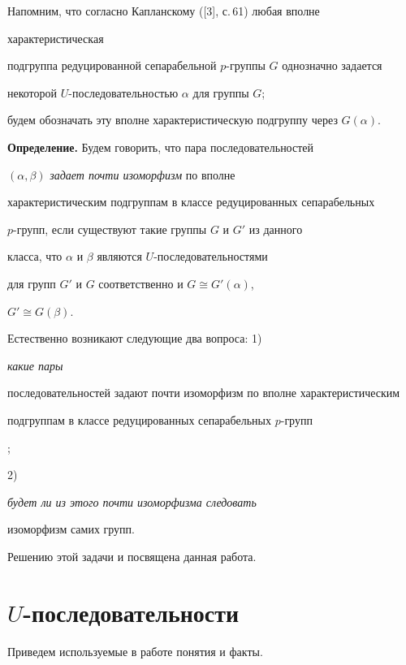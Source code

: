 Напомним, что согласно Капланскому ([3], с.\,61) любая вполне


характеристическая


подгруппа редуцированной сепарабельной $p$-группы $G$ однозначно задается


некоторой $U$-последова\-тельностью $\alpha$ для группы $G$;


будем обозначать эту вполне характеристическую подгруппу через $G(\alpha)$.


\medskip





{\bf Определение.} Будем говорить, что пара последовательностей


$(\alpha,\beta)$ {\it задает почти изоморфизм} по вполне


характеристическим подгруппам в классе редуцированных сепарабельных


$p$-групп, если существуют такие группы $G$ и $G'$ из данного


класса, что $\alpha$ и $\beta$ являются $U$-последовательностями


для групп $G'$ и $G$ соответственно и $G\cong G'(\alpha)$,


$G'\cong G(\beta)$.


\medskip





Естественно возникают следующие два вопроса: 1)~{\it{}какие пары


последовательностей задают почти изоморфизм по вполне характеристическим


подгруппам в классе редуцированных сепарабельных $p$-групп};


2)~{\it{}будет ли из этого почти изоморфизма следовать


изоморфизм самих групп.}





Решению этой задачи и посвящена данная работа.





\section{$U$-последовательности}





Приведем используемые в работе понятия и факты.





